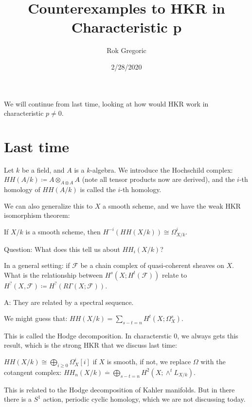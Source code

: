 \documentclass[../main.tex]{subfiles}
\title{Counterexamples to HKR in Characteristic p}
\author{Rok Gregoric}
\date{2/28/2020}
\begin{document}
\maketitle


\noindent We will continue from last time, looking at how would HKR work in characteristic $p \neq 0$.



\tableofcontents

\section{Last time}

Let $k$ be a field, and $A$ is a $k$-algebra. We introduce the Hochschild complex: $HH(A/k) \coloneqq A \otimes_{A \otimes A} A$ (note all tensor products now are derived), and the $i$-th homology of $HH(A/k)$ is called the $i$-th homology.

We can also generalize this to $X$ a smooth scheme, and we have the weak HKR isomorphism theorem:

\begin{theorem}
If $X/k$ is a smooth scheme, then $H^{-i}(HH(X/k)) \cong \Omega^i_{X/k}$.


\end{theorem}

Question: What does this tell us about $HH_i(X/k)$?

In a general setting: if $\mathcal{F}$ be a chain complex of quasi-coherent sheaves on $X$. What is the relationship between $H^s(X;H^t(\mathcal{F}))$ relate to $H^?(X, \mathcal{F}) \coloneqq H^?(R\Gamma(X;\mathcal{F}))$.

A: They are related by a spectral sequence.

We might guess that: $HH(X/k) = \sum_{s-t=n} H^t(X; \Omega^s_X)$.

This is called the Hodge decomposition. In characterstic 0, we always gets this result, which is the strong HKR that we discuss last time:

\begin{theorem}
$HH(X/k) \cong \bigoplus_{i \geq 0} \Omega^i_X[i]$ if $X$ is smooth, if not, we replace $\Omega$ with the cotangent complex: $HH_n(X/k) \overline{=} \bigoplus_{s-t =n}H^2(X;\wedge^tL_{X/k})$.
\end{theorem}

This is related to the Hodge decomposition of Kahler manifolds. But in there there is a $S^1$ action, periodic cyclic homology, which we are not discussing today.
\end{document}
